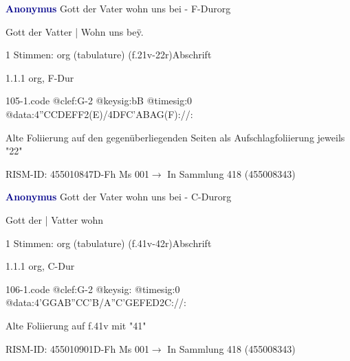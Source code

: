 \documentclass[twocolumn, 12pt]{book}
\begin{document}
\par \vspace{16pt} \textcolor{darkblue}{\textbf{Anonymus  }}\hfillplus{\textbf{[105]}}\newline Gott der Vater wohn uns bei - F-Dur\newline org
\par \begin{itshape}[f.21v, at left:] Gott der Vatter | Wohn uns beÿ.\end{itshape} 
\par \textcolor{darkblue}{}  1 Stimmen: org (tabulature)  (f.21v-22r)\newline Abschrift
\par 1.1.1  org, F-Dur  
\begin{filecontents*}{105-1.code}
@clef:G-2
@keysig:bB
@timesig:0
@data:4''CCDEFF2(E)/4DFC'ABAG(F)://:
\end{filecontents*}
\newline %
\par Alte Foliierung auf den gegenüberliegenden Seiten als Aufschlagfoliierung jeweils "22"
\par RISM-ID: 455010847\newline D-Fh  Ms 001\newline $\rightarrow$ In Sammlung 418 (455008343)
      
\par \vspace{16pt} \textcolor{darkblue}{\textbf{Anonymus  }}\hfillplus{\textbf{[106]}}\newline Gott der Vater wohn uns bei - C-Dur\newline org
\par \begin{itshape}[f.41v, at left:] Gott der | Vatter wohn\end{itshape} 
\par \textcolor{darkblue}{}  1 Stimmen: org (tabulature)  (f.41v-42r)\newline Abschrift
\par 1.1.1  org, C-Dur  
\begin{filecontents*}{106-1.code}
@clef:G-2
@keysig:
@timesig:0
@data:4'GGAB''CC'B/A''C'GEFED2C://:
\end{filecontents*}
\newline %
\par Alte Foliierung auf f.41v mit "41"
\par RISM-ID: 455010901\newline D-Fh  Ms 001\newline $\rightarrow$ In Sammlung 418 (455008343)
      
\end{document}
